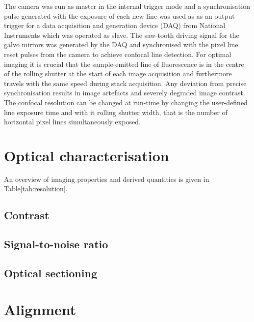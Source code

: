 \documentclass[12pt]{spieman}  %
\begin{document}
The camera was run as master in the internal trigger mode and a synchronisation pulse generated with the exposure of each new line was used as as an output trigger for a data acquisition and generation device (DAQ) from National Instruments which was operated as slave. The saw-tooth driving signal for the galvo mirrors was generated by the DAQ and synchronised with the pixel line reset pulses from the camera to achieve confocal line detection\cite{Baumgart2012}. For optimal imaging it is crucial that the sample-emitted line of fluorescence is in the centre of the rolling shutter at the start of each image acquisition and furthermore travels with the same speed during stack acquisition. Any deviation from precise synchronisation results in image artefacts and severely degraded image contrast. The confocal resolution can be changed at run-time by changing the user-defined line exposure time and with it rolling shutter width, that is the number of horizontal pixel lines simultaneously exposed.   
 




\section{Optical characterisation}
An overview of imaging properties and derived quantities is given in Table\ref{tab:resolution}.	



	
	\subsection{Contrast}
	
	\subsection{Signal-to-noise ratio}
	
	\subsection{Optical sectioning}	
	
\section{Alignment}
\end{document}
